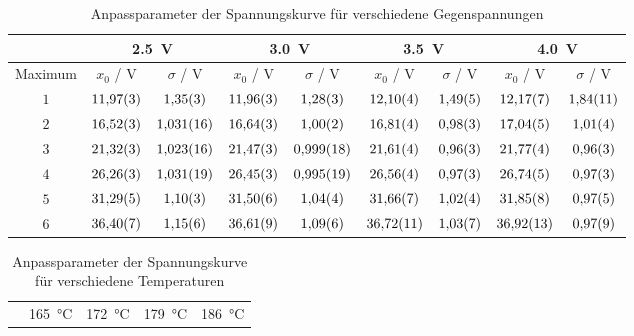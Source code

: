 \begin{table}[htb]
   \centering
\caption{Anpassparameter der Spannungskurve für verschiedene Gegenspannungen}
\begin{tabular}{c|cc|cc|cc|cc}
\hline & \multicolumn{2}{|c}{\SI{2.5}{\volt}} & \multicolumn{2}{|c}{\SI{3.0}{\volt}} & \multicolumn{2}{|c}{\SI{3.5}{\volt}} & \multicolumn{2}{|c}{\SI{4.0}{\volt}}\\

\hline
Maximum & $x_0$ / \unit{\volt} & $\sigma$ / \unit{\volt} & $x_0$ / \unit{\volt} & $\sigma$ / \unit{\volt} & $x_0$ / \unit{\volt} & $\sigma$ / \unit{\volt} & $x_0$ / \unit{\volt} & $\sigma$ / \unit{\volt} \\ 
\hline
$\num{1}$ & $\num{11.97\pm 0.03}$ & $\num{1.35\pm 0.03}$ & $\num{11.96\pm 0.03}$ & $\num{1.28\pm 0.03}$ & $\num{12.10\pm 0.04}$ & $\num{1.49\pm 0.05}$ & $\num{12.17\pm 0.07}$ & $\num{1.84\pm 0.11}$ \\
$\num{2}$ & $\num{16.52\pm 0.03}$ & $\num{1.031\pm 0.016}$ & $\num{16.64\pm 0.03}$ & $\num{1.00\pm 0.02}$ & $\num{16.81\pm 0.04}$ & $\num{0.98\pm 0.03}$ & $\num{17.04\pm 0.05}$ & $\num{1.01\pm 0.04}$ \\
$\num{3}$ & $\num{21.32\pm 0.03}$ & $\num{1.023\pm 0.016}$ & $\num{21.47\pm 0.03}$ & $\num{0.999\pm 0.018}$ & $\num{21.61\pm 0.04}$ & $\num{0.96\pm 0.03}$ & $\num{21.77\pm 0.04}$ & $\num{0.96\pm 0.03}$ \\
$\num{4}$ & $\num{26.26\pm 0.03}$ & $\num{1.031\pm 0.019}$ & $\num{26.45\pm 0.03}$ & $\num{0.995\pm 0.019}$ & $\num{26.56\pm 0.04}$ & $\num{0.97\pm 0.03}$ & $\num{26.74\pm 0.05}$ & $\num{0.97\pm 0.03}$ \\
$\num{5}$ & $\num{31.29\pm 0.05}$ & $\num{1.10\pm 0.03}$ & $\num{31.50\pm 0.06}$ & $\num{1.04\pm 0.04}$ & $\num{31.66\pm 0.07}$ & $\num{1.02\pm 0.04}$ & $\num{31.85\pm 0.08}$ & $\num{0.97\pm 0.05}$ \\
$\num{6}$ & $\num{36.40\pm 0.07}$ & $\num{1.15\pm 0.06}$ & $\num{36.61\pm 0.09}$ & $\num{1.09\pm 0.06}$ & $\num{36.72\pm 0.11}$ & $\num{1.03\pm 0.07}$ & $\num{36.92\pm 0.13}$ & $\num{0.97\pm 0.09}$ \\
\hline\end{tabular}
\label{tab:gegenspannung}
\end{table}\begin{table}[htb]
   \centering
\caption{Anpassparameter der Spannungskurve für verschiedene Temperaturen}
\begin{tabular}{c|cc|cc|cc|cc}
\hline & \multicolumn{2}{|c}{\SI{165}{\celsius}} & \multicolumn{2}{|c}{\SI{172}{\celsius}} & \multicolumn{2}{|c}{\SI{179}{\celsius}} & \multicolumn{2}{|c}{\SI{186}{\celsius}}\\


\end{tabular}
\end{table}
